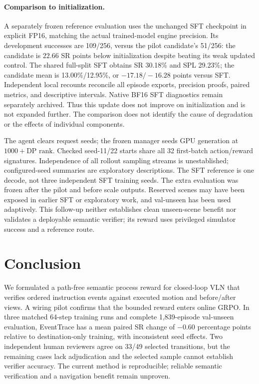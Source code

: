 \documentclass[10pt,twocolumn,letterpaper]{article}
\begin{document}
\paragraph{Comparison to initialization.} A separately frozen reference
evaluation uses the unchanged SFT checkpoint in explicit FP16, matching
the actual trained-model engine precision. Its development successes are
109/256, versus the pilot candidate's 51/256: the candidate is $22.66$ SR
points below initialization despite beating its weak updated control.
The shared full-split SFT obtains SR 30.18\% and SPL 29.23\%; the candidate
mean is 13.00\%/12.95\%, or $-17.18/-16.28$ points versus SFT.
Independent local recounts reconcile all episode exports, precision
proofs, paired metrics, and descriptive intervals. Native BF16 SFT
diagnostics remain separately archived. Thus this update does not improve
on initialization and is not expanded further. The comparison does not
identify the cause of degradation or the effects of individual components.

The agent clears request seeds; the frozen manager seeds GPU generation
at $1000+\text{DP rank}$. Checked seed-11/22 starts share all 32 first-batch
action/reward signatures. Independence of all rollout sampling streams
is unestablished; configured-seed summaries are exploratory descriptions.
The SFT reference is one decode, not three independent SFT training seeds.
The extra evaluation was frozen after the pilot and before scale outputs.
Reserved scenes may have been exposed in earlier SFT or exploratory work,
and val-unseen has been used adaptively. This follow-up neither establishes
clean unseen-scene benefit nor validates a deployable semantic verifier;
its reward uses privileged simulator success and a reference route.

\section{Conclusion}
We formulated a path-free semantic process reward for closed-loop VLN that verifies ordered instruction events against executed motion and before/after views. A wiring pilot confirms that the bounded reward enters online GRPO. In three matched 64-step training runs and complete 1,839-episode val-unseen evaluation, EventTrace has a mean paired SR change of $-0.60$ percentage points relative to destination-only training, with inconsistent seed effects. Two independent human reviewers agree on 33/49 selected transitions, but the remaining cases lack adjudication and the selected sample cannot establish verifier accuracy. The current method is reproducible; reliable semantic verification and a navigation benefit remain unproven.
\end{document}
